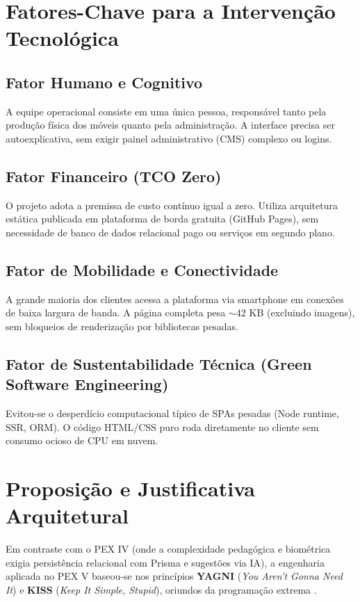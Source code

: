 \documentclass[12pt,a4paper]{article}
\begin{document}
\section{Fatores-Chave para a Intervenção Tecnológica}

\subsection{Fator Humano e Cognitivo}
A equipe operacional consiste em uma única pessoa, responsável tanto pela produção física dos móveis quanto pela administração. A interface precisa ser autoexplicativa, sem exigir painel administrativo (CMS) complexo ou logins.

\subsection{Fator Financeiro (TCO Zero)}
O projeto adota a premissa de custo contínuo igual a zero. Utiliza arquitetura estática publicada em plataforma de borda gratuita (GitHub Pages), sem necessidade de banco de dados relacional pago ou serviços em segundo plano.

\subsection{Fator de Mobilidade e Conectividade}
A grande maioria dos clientes acessa a plataforma via smartphone em conexões de baixa largura de banda. A página completa pesa $\sim$42 KB (excluindo imagens), sem bloqueios de renderização por bibliotecas pesadas.

\subsection{Fator de Sustentabilidade Técnica (Green Software Engineering)}
Evitou-se o desperdício computacional típico de SPAs pesadas (Node runtime, SSR, ORM). O código HTML/CSS puro roda diretamente no cliente sem consumo ocioso de CPU em nuvem.



\section{Proposição e Justificativa Arquitetural}

Em contraste com o PEX IV (onde a complexidade pedagógica e biométrica exigia persistência relacional com Prisma e sugestões via IA), a engenharia aplicada no PEX V baseou-se nos princípios \textbf{YAGNI} (\textit{You Aren't Gonna Need It}) e \textbf{KISS} (\textit{Keep It Simple, Stupid}), oriundos da programação extrema \cite{beck1999}.
\end{document}
